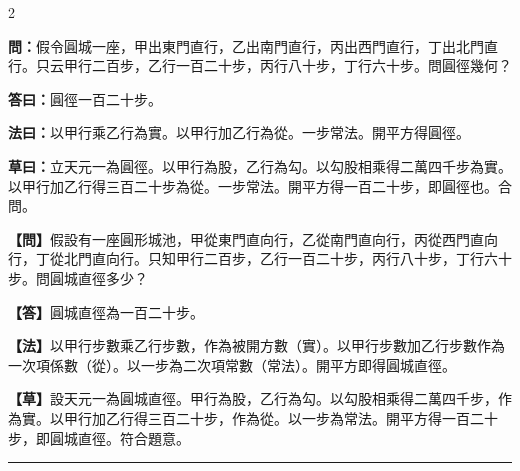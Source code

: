 \documentclass[11pt,a4paper]{article}
\newcommand{\longline}{\noindent\rule{\textwidth}{0.4pt}}
\newcommand{\wenC}[1]{\par\noindent\textbf{\textcolor{probcolor}{問：}}{#1}\par}
\newcommand{\daC}[1]{\par\noindent\textbf{\textcolor{anscolor}{答曰：}}{#1}\par}
\newcommand{\fayueC}[1]{\par\noindent\textbf{\textcolor{methodcolor}{法曰：}}{#1}\par}
\newcommand{\caoyueC}[1]{\par\noindent\textbf{草曰：}{#1}\par}
\newcommand{\wenM}[1]{\par\noindent\textbf{\textcolor{probcolor}{【問】}}{#1}\par}
\newcommand{\daM}[1]{\par\noindent\textbf{\textcolor{anscolor}{【答】}}{#1}\par}
\newcommand{\fayueM}[1]{\par\noindent\textbf{\textcolor{methodcolor}{【法】}}{#1}\par}
\newcommand{\caoyueM}[1]{\par\noindent\textbf{【草】}{#1}\par}
\begin{document}
\begin{paracol}{2}

\wenC{假令圓城一座，甲出東門直行，乙出南門直行，丙出西門直行，丁出北門直行。只云甲行二百步，乙行一百二十步，丙行八十步，丁行六十步。問圓徑幾何？}

\daC{圓徑一百二十步。}

\fayueC{以甲行乘乙行為實。以甲行加乙行為從。一步常法。開平方得圓徑。}

\caoyueC{立天元一為圓徑。以甲行為股，乙行為勾。以勾股相乘得二萬四千步為實。以甲行加乙行得三百二十步為從。一步常法。開平方得一百二十步，即圓徑也。合問。}

\switchcolumn

\wenM{假設有一座圓形城池，甲從東門直向行，乙從南門直向行，丙從西門直向行，丁從北門直向行。只知甲行二百步，乙行一百二十步，丙行八十步，丁行六十步。問圓城直徑多少？}

\daM{圓城直徑為一百二十步。}

\fayueM{以甲行步數乘乙行步數，作為被開方數（實）。以甲行步數加乙行步數作為一次項係數（從）。以一步為二次項常數（常法）。開平方即得圓城直徑。}

\caoyueM{設天元一為圓城直徑。甲行為股，乙行為勾。以勾股相乘得二萬四千步，作為實。以甲行加乙行得三百二十步，作為從。以一步為常法。開平方得一百二十步，即圓城直徑。符合題意。}

\end{paracol}

\vspace{0.3cm}
\longline
\end{document}
